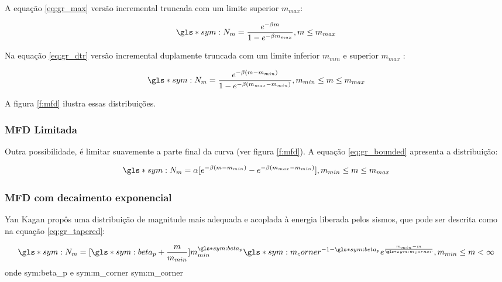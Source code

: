 A equação \eqref{eq:gr_max} versão incremental truncada com um limite superior $m_{max}$:

\begin{equation}
		\gls*{sym:N_m} = \frac{e^{-\beta m}}{1 -e^{-\beta m_{max}} }, m \leq m_{max}
	\label{eq:gr_max}
\end{equation}

Na equação \eqref{eq:gr_dtr} versão incremental duplamente truncada com um limite inferior $m_{min}$ e superior $m_{max}$ :

\begin{equation}
		\gls*{sym:N_m} = \frac{e^{-\beta (m - m_{min})}}{1 -e^{-\beta (m_{max} - m_{min}) } } , m_{min} \leq m \leq m_{max}
	\label{eq:gr_dtr}
\end{equation}

A figura \ref{f:mfd} ilustra essas distribuições.

\subsubsection{MFD Limitada}
\label{sec:BMFD}

Outra possibilidade, é limitar suavemente a parte final da curva (ver figura \ref{f:mfd}). A equação \eqref{eq:gr_bounded} apresenta
a distribuição:

\begin{equation}
		\gls*{sym:N_m} = \alpha [ e^{-\beta (m - m_{min})} - e^{-\beta (m_{max} - m_{min}) } ], m_{min} \leq m \leq m_{max}
	\label{eq:gr_bounded}
\end{equation}


\subsubsection{MFD com decaimento exponencial}
\label{sec:KMFD}

Yan Kagan \citep{kagan_2002} propôs uma distribuição de magnitude mais adequada e acoplada à energia liberada pelos sismos, que
pode ser descrita como na equação \eqref{eq:gr_tapered}:

\begin{equation}\ensuremath{
		\gls*{sym:N_m} = [\gls*{sym:beta_p} + \frac{m}{m_{min}}]
				m_{min}^{\gls*{sym:beta_p}}
				\gls*{sym:m_corner}^{-1 -\gls*{sym:beta_p}}
				e^{\frac{m_{min} - m}{\gls*{sym:m_corner}}},
				m_{min} \leq m < \infty
		}
	\label{eq:gr_tapered}
\end{equation}
onde \glsdesc*{sym:beta_p} e \gls*{sym:m_corner} \glsdesc*{sym:m_corner}

